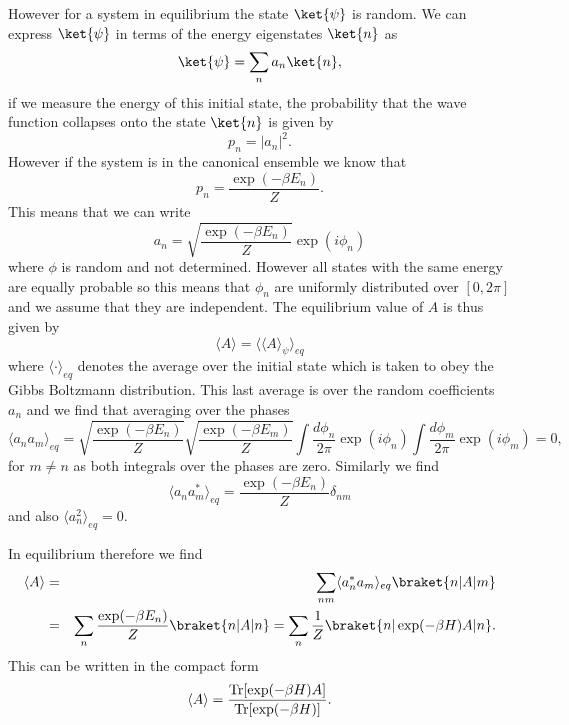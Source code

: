 However for a system in equilibrium the state $\ket{\psi}$ is random. We can express
$\ket{\psi}$ in terms of the energy eigenstates $\ket{n}$ as
\begin{equation}
\ket{\psi}=\sum_{n} a_n \ket{n},
\end{equation}
if we measure the energy of this initial state, the probability that the wave function collapses onto the state $\ket{n}$ is given by
\begin{equation}
p_n = |a_n|^2.
\end{equation}
However if the system is in the canonical ensemble we know that 
\begin{equation}
p_n = \frac{\exp(-\beta E_n)}{Z}.
\end{equation}
This means that we can write
\begin{equation}
a_n = \sqrt{\frac{\exp(-\beta E_n)}{Z}}\exp(i\phi_n)
\end{equation}
where $\phi$ is random and not determined. However all  states with the same energy are
equally probable so this means that $\phi_n$ are uniformly distributed over $[0,2\pi]$ and we assume that they are independent. The equilibrium value of $A$ is thus given by
\begin{equation}
\langle A\rangle = \langle \langle A\rangle_\psi\rangle_{eq}
\end{equation}
where $\langle \cdot \rangle_{eq}$ denotes the average over the initial state which is taken to obey the Gibbs Boltzmann distribution. This last average is over the random coefficients
$a_n$ and we find that averaging over the phases
\begin{equation}
\langle a_n a_m\rangle_{eq}  =  \sqrt{\frac{\exp(-\beta E_n)}{Z}} \sqrt{\frac{\exp(-\beta E_m)}{Z}}
\int \frac{d\phi_n}{2\pi} \exp(i\phi_n) \int \frac{d\phi_m}{2\pi} \exp(i\phi_m)  = 0,
\end{equation}
for $m\neq n$
as both integrals over the phases are zero. Similarly we find
\begin{equation}
\langle a_n a^*_m\rangle_{eq}  =  \frac{\exp(-\beta E_n)}{Z} \delta_{nm}
\end{equation}
and also $\langle a_n^2 \rangle_{eq} = 0$.

In equilibrium therefore we find
\begin{eqnarray}
\langle A\rangle &=&  \sum_{nm}\langle a_n^* a_m\rangle_{eq} \braket{n|A|m}\nonumber \\
&=& \sum_n \frac{\exp(-\beta E_n)}{Z} \braket{n|A|n} = \sum_n \frac{1}{Z} \braket{n|\exp(-\beta H)A|n}.
\end{eqnarray}
This can be written in the compact form
\begin{equation}
\langle A\rangle = \frac{{\rm Tr}[ \exp(-\beta H)A]}{{\rm Tr} [\exp(-\beta H)]}.
\end{equation}

